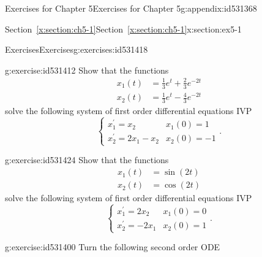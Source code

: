 \documentclass[oneside,10pt,]{book}
\newcommand{\xreffont}{\relax}
\numberwithin{equation}{section}
\numberwithin{equation}{section}
\newcommand{\amp}{&}
\begin{document}
\begin{appendixptx}{Exercises for Chapter 5}{}{Exercises for Chapter 5}{}{}{g:appendix:id531368}
%
%
\typeout{************************************************}
\typeout{Section F.1 Section~{\xreffont\ref*{x:section:ch5-1}}}
\typeout{************************************************}
%
\begin{sectionptx}{Section~{\xreffont\ref*{x:section:ch5-1}}}{}{Section~{\xreffont\ref*{x:section:ch5-1}}}{}{}{x:section:ex5-1}
%
%
\typeout{************************************************}
\typeout{************************************************}
%
\begin{exercises-subsection-numberless}{Exercises}{}{Exercises}{}{}{g:exercises:id531418}
\begin{divisionexercise}{1}{}{}{g:exercise:id531412}%
Show that the functions%
\begin{align*}
x_{1}(t) \amp =\frac{1}{3}e^{t}+\frac{2}{3}e^{-2t}\\
x_{2}(t) \amp =\frac{1}{3}e^{t}-\frac{4}{3}e^{-2t}
\end{align*}
solve the following system of first order differential equations IVP%
\begin{equation*}
\begin{cases}
x_{1}^{\prime}=x_{2} \amp x_{1}(0)=1\\
x_{2}^{\prime}=2x_{1}-x_{2} \amp x_{2}(0)=-1
\end{cases}.
\end{equation*}
%
\end{divisionexercise}%
\begin{divisionexercise}{2}{}{}{g:exercise:id531424}%
Show that the functions%
\begin{align*}
x_{1}(t) \amp =\sin\left(2t\right)\\
x_{2}(t) \amp =\cos\left(2t\right)
\end{align*}
solve the following system of first order differential equations IVP%
\begin{equation*}
\begin{cases}
x_{1}^{\prime}=2x_{2} \amp x_{1}(0)=0\\
x_{2}^{\prime}=-2x_{1} \amp x_{2}(0)=1
\end{cases}.
\end{equation*}
%
\end{divisionexercise}%
\begin{divisionexercise}{3}{}{}{g:exercise:id531400}%
Turn the following second order ODE%
\begin{equation*}

\end{equation*}
\end{divisionexercise}
\end{exercises-subsection-numberless}
\end{sectionptx}
\end{appendixptx}
\end{document}
